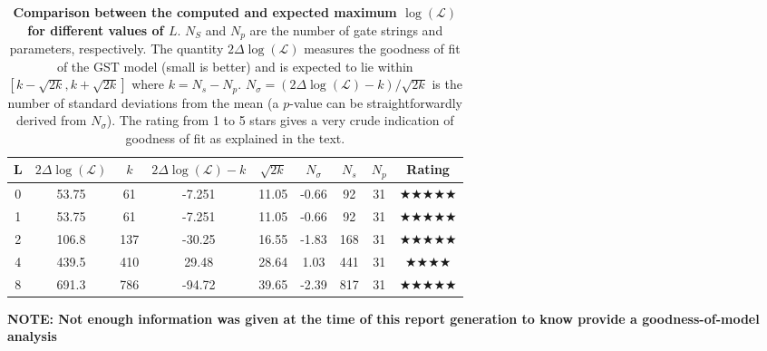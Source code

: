 \documentclass{article}[11pt]
\begin{document}
{\begin{table}[h]
\begin{center}
\begin{tabular}[l]{|c|c|c|c|c|c|c|c|c|}
\hline
L & $2\Delta\log(\mathcal{L})$ & $k$ & $2\Delta\log(\mathcal{L})-k$ & $\sqrt{2k}$ & $N_\sigma$ & $N_s$ & $N_p$ & Rating \\ \hline
0 & 53.75 & 61 & -7.251 & 11.05 & -0.66 & 92 & 31 & $\bigstar\bigstar\bigstar\bigstar\bigstar$ \\ \hline
1 & 53.75 & 61 & -7.251 & 11.05 & -0.66 & 92 & 31 & $\bigstar\bigstar\bigstar\bigstar\bigstar$ \\ \hline
2 & 106.8 & 137 & -30.25 & 16.55 & -1.83 & 168 & 31 & $\bigstar\bigstar\bigstar\bigstar\bigstar$ \\ \hline
4 & 439.5 & 410 & 29.48 & 28.64 & 1.03 & 441 & 31 & $\bigstar\bigstar\bigstar\bigstar$ \\ \hline
8 & 691.3 & 786 & -94.72 & 39.65 & -2.39 & 817 & 31 & $\bigstar\bigstar\bigstar\bigstar\bigstar$ \\ \hline
\end{tabular}

\caption{\textbf{Comparison between the computed and expected maximum $\log(\mathcal{L})$ for different values of $L$}.  $N_S$ and $N_p$ are the number of gate strings and parameters, respectively.  The quantity $2\Delta\log(\mathcal{L})$ measures the goodness of fit of the GST model (small is better) and is expected to lie within $[k-\sqrt{2k},k+\sqrt{2k}]$ where $k = N_s-N_p$. $N_\sigma = (2\Delta\log(\mathcal{L})-k)/\sqrt{2k}$ is the number of standard deviations from the mean (a $p$-value can be straightforwardly derived from $N_\sigma$).  The rating from 1 to 5 stars gives a very crude indication of goodness of fit as explained in the text.\label{progressTable}}
\end{center}
\end{table}

}{
\textbf{NOTE: Not enough information was given at the time of this report generation to know provide a goodness-of-model analysis}
}

\FloatBarrier
\end{document}
